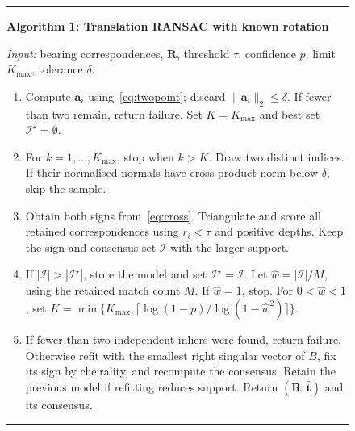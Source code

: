 \documentclass[10pt,a4paper,twocolumn]{article}
\newcommand{\R}{\mathbf R}
\newcommand{\ttt}{\mathbf t}
\newcommand{\avec}{\mathbf a}
\begin{document}
\begin{figure}[t]
\small
\hrule\vspace{4pt}
\textbf{Algorithm 1: Translation RANSAC with known rotation}\par
\textit{Input:} bearing correspondences, $\R$, threshold $\tau$, confidence $p$, limit $K_{\max}$, tolerance $\delta$.\par
\begin{enumerate}\setlength{\itemsep}{2pt}\setlength{\parskip}{0pt}\setlength{\topsep}{3pt}
\item Compute $\avec_i$ using~\eqref{eq:twopoint}; discard $\|\avec_i\|_2\leq\delta$. If fewer than two remain, return failure. Set $K=K_{\max}$ and best set $\mathcal I^\star=\emptyset$.
\item For $k=1,\ldots,K_{\max}$, stop when $k>K$. Draw two distinct indices. If their normalised normals have cross-product norm below $\delta$, skip the sample.
\item Obtain both signs from~\eqref{eq:cross}. Triangulate and score all retained correspondences using $r_i<\tau$ and positive depths. Keep the sign and consensus set $\mathcal I$ with the larger support.
\item If $|\mathcal I|>|\mathcal I^\star|$, store the model and set $\mathcal I^\star=\mathcal I$. Let $\widehat w=|\mathcal I|/M$, using the retained match count $M$. If $\widehat w=1$, stop. For $0<\widehat w<1$, set $K=\min\{K_{\max},\lceil\log(1-p)/\log(1-\widehat w^2)\rceil\}$.
\item If fewer than two independent inliers were found, return failure. Otherwise refit with the smallest right singular vector of $B$, fix its sign by cheirality, and recompute the consensus. Retain the previous model if refitting reduces support. Return $(\R,\widehat{\ttt})$ and its consensus.
\end{enumerate}
\vspace{2pt}\hrule
\end{figure}




\renewcommand{\bibsection}{\section*{References}}
\renewcommand{\bibfont}{\small}
\setlength{\bibsep}{2pt}


\end{document}
